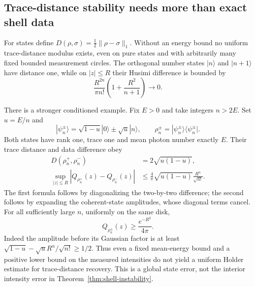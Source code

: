 \subsection{Trace-distance stability needs more than exact shell data}
For states define $D(\rho,\sigma)=\tfrac12\|\rho-\sigma\|_1$. Without an
energy bound no uniform trace-distance modulus exists, even on pure states
and with arbitrarily many fixed bounded measurement circles. The orthogonal
number states $|n\rangle$ and $|n+1\rangle$ have distance one, while on
$|z|\le R$ their Husimi difference is bounded by
\[
 \frac{R^{2n}}{\pi n!}\left(1+\frac{R^2}{n+1}\right)\longrightarrow0.
\]

There is a stronger conditioned example. Fix $E>0$ and take integers $n>2E$.
Set $u=E/n$ and
\[
 |\psi_n^\pm\rangle=\sqrt{1-u}|0\rangle\pm\sqrt u|n\rangle,
 \qquad \rho_n^\pm=|\psi_n^\pm\rangle\langle\psi_n^\pm|.
\]
Both states have rank one, trace one and mean photon number exactly $E$.
Their trace distance and data difference obey
\begin{align}
 D(\rho_n^+,\rho_n^-)&=2\sqrt{u(1-u)},\label{eq:husimi-trace-gap}\\
 \sup_{|z|\le R}|Q_{\rho_n^+}(z)-Q_{\rho_n^-}(z)|
 &\le\frac4\pi\sqrt{u(1-u)}\frac{R^n}{\sqrt{n!}}.
 \label{eq:husimi-data-small}
\end{align}
The first formula follows by diagonalizing the two-by-two difference; the
second follows by expanding the coherent-state amplitudes, whose diagonal
terms cancel. For all sufficiently large $n$, uniformly on the same disk,
\[
 Q_{\rho_n^\pm}(z)\ge\frac{e^{-R^2}}{4\pi}.
\]
Indeed the amplitude before its Gaussian factor is at least
$\sqrt{1-u}-\sqrt u R^n/\sqrt{n!}\ge1/2$.
Thus even a fixed mean-energy bound and a positive lower bound on the measured
intensities do not yield a uniform Holder estimate for trace-distance recovery.
This is a global state error, not the interior intensity error in
Theorem~\ref{thm:shell-instability}.

